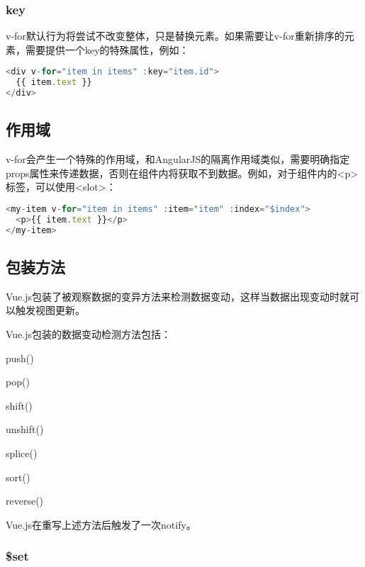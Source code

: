 \subsubsection{key}


v-for默认行为将尝试不改变整体，只是替换元素。如果需要让v-for重新排序的元素，需要提供一个key的特殊属性，例如：


\begin{lstlisting}[language=JavaScript]
<div v-for="item in items" :key="item.id">
  {{ item.text }}
</div>
\end{lstlisting}



\subsection{作用域}

v-for会产生一个特殊的作用域，和AngularJS的隔离作用域类似，需要明确指定props属性来传递数据，否则在组件内将获取不到数据。例如，对于组件内的<p>标签，可以使用<slot>：


\begin{lstlisting}[language=JavaScript]
<my-item v-for="item in items" :item="item" :index="$index">
  <p>{{ item.text }}</p>
</my-item>
\end{lstlisting}

\subsection{包装方法}

Vue.js包装了被观察数据的变异方法来检测数据变动，这样当数据出现变动时就可以触发视图更新。


Vue.js包装的数据变动检测方法包括：

\begin{compactitem}
\item push()
\item pop()
\item shift()
\item unshift()
\item splice()
\item sort()
\item reverse()
\end{compactitem}


Vue.js在重写上述方法后触发了一次notify。




\subsubsection{\$set}

